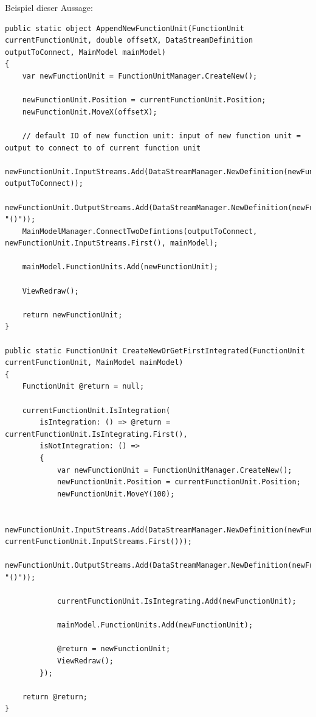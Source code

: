 \documentclass[11pt]{article}
\begin{document}
Beispiel dieser Aussage:
\begin{verbatim}
public static object AppendNewFunctionUnit(FunctionUnit currentFunctionUnit, double offsetX, DataStreamDefinition outputToConnect, MainModel mainModel)
{
    var newFunctionUnit = FunctionUnitManager.CreateNew();

    newFunctionUnit.Position = currentFunctionUnit.Position;
    newFunctionUnit.MoveX(offsetX);

    // default IO of new function unit: input of new function unit = output to connect to of current function unit
    newFunctionUnit.InputStreams.Add(DataStreamManager.NewDefinition(newFunctionUnit, outputToConnect));
    newFunctionUnit.OutputStreams.Add(DataStreamManager.NewDefinition(newFunctionUnit, "()"));
    MainModelManager.ConnectTwoDefintions(outputToConnect, newFunctionUnit.InputStreams.First(), mainModel);

    mainModel.FunctionUnits.Add(newFunctionUnit);

    ViewRedraw();

    return newFunctionUnit;
}

public static FunctionUnit CreateNewOrGetFirstIntegrated(FunctionUnit currentFunctionUnit, MainModel mainModel)
{
    FunctionUnit @return = null;

    currentFunctionUnit.IsIntegration(
        isIntegration: () => @return = currentFunctionUnit.IsIntegrating.First(),
        isNotIntegration: () =>
        {
            var newFunctionUnit = FunctionUnitManager.CreateNew();
            newFunctionUnit.Position = currentFunctionUnit.Position;
            newFunctionUnit.MoveY(100);

            newFunctionUnit.InputStreams.Add(DataStreamManager.NewDefinition(newFunctionUnit, currentFunctionUnit.InputStreams.First()));
            newFunctionUnit.OutputStreams.Add(DataStreamManager.NewDefinition(newFunctionUnit, "()"));

            currentFunctionUnit.IsIntegrating.Add(newFunctionUnit);

            mainModel.FunctionUnits.Add(newFunctionUnit);

            @return = newFunctionUnit;
            ViewRedraw();
        });

    return @return;
}
\end{verbatim}
\end{document}
